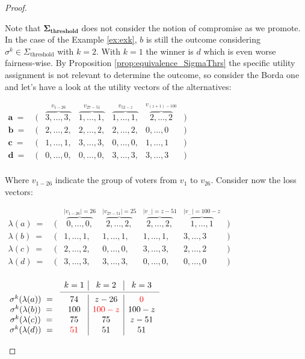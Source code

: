 \documentclass[version=3.21, pagesize, notitlepage, twoside=off, bibliography=totoc, DIV=calc, fontsize=12pt, a4paper]{scrartcl}
\begin{document}
\begin{proof}
\begin{example}
	Note that $\mathbf{\Sigma_\text{threshold}}$ does not consider the notion of compromise as we promote. In the case of the Example \ref{ex:exk}, $b$ is still the outcome considering $\sigma^k \in \Sigma_\text{threshold}$ with $k = 2$. With $k=1$ the winner is $d$ which is even worse fairness-wise. By Proposition \ref{prop:equivalence_SigmaThrs} the specific utility assignment is not relevant to determine the outcome, so consider the Borda one and let's have a look at the utility vectors of the alternatives:
	
	\begin{center}
		$
		\begin{array}{ccccccc}
		\mathbf{a} \ = \ &(& \overbrace{3, \dots,3,}^{v_{1-26}} & \overbrace{1, \dots, 1,}^{v_{27-51}} & \overbrace{1, \dots, 1,}^{v_{52-z}} & \overbrace{2, \dots, 2}^{v_{(z+1)-100}} &) \\
		\mathbf{b}\ = \ &(& 2, \dots,2, & 2, \dots, 2, & 2, \dots, 2, & 0, \dots, 0 &) \\
		\mathbf{c}\ = \ &(& 1, \dots,1, & 3, \dots, 3, & 0, \dots, 0, & 1, \dots, 1 &) \\
		\mathbf{d}\ = \ &(& 0, \dots,0, & 0, \dots, 0, & 3, \dots, 3, & 3, \dots, 3 &) \\
		\end{array}
		$
	\end{center}
	
	Where $v_{1-26}$ indicate the group of voters from $v_1$ to $v_{26}$. Consider now the loss vectors: 

	\begin{center}
		$
		\begin{array}{ccccccc}
		\lambda(a)\ = \ &(& \overbrace{0, \dots,0,}^{|v_{1-26}|=26} & \overbrace{2, \dots, 2,}^{|v_{27-51}|=25} & \overbrace{2, \dots, 2,}^{|v_{\dots}|=z-51} & \overbrace{1, \dots, 1}^{|v_{\dots}|=100-z} &) \\
		\lambda(b)\ = \ &(& 1, \dots,1, & 1, \dots, 1, & 1, \dots, 1, & 3, \dots, 3 &) \\
		\lambda(c)\ = \ &(& 2, \dots,2, & 0, \dots, 0, & 3, \dots, 3, & 2, \dots, 2 &) \\
		\lambda(d)\ = \ &(& 3, \dots,3, & 3, \dots, 3, & 0, \dots, 0, & 0, \dots, 0 &) \\
		\end{array}
		$
	\end{center}
	
	\begin{center}
		$
		\begin{array}{cc|c|c}
		& k=1 & k=2 & k=3 \\ \cmidrule{2-4}
		\sigma^k (\lambda (a))\ = \ & 74 & z-26 & {\color{red}0} \\
		\sigma^k (\lambda (b))\ = \ & 100 & {\color{red}100-z} & 100-z \\
		\sigma^k (\lambda (c))\ = \ & 75 & 75 & z-51 \\
		\sigma^k (\lambda (d))\ = \ & {\color{red}51} & 51 & 51 \\
		\end{array}
		$
	\end{center}	
	

\end{example}
\end{proof}
\end{document}
